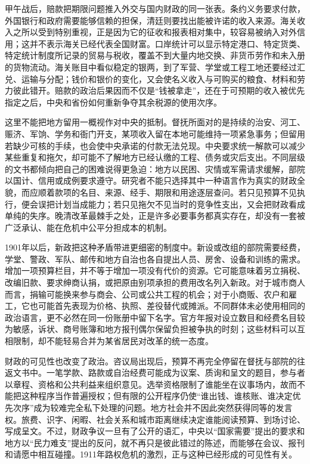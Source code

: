 甲午战后，赔款把期限问题推入外交与国内财政的同一张表。条约义务要求付款，外国银行和政府需要能够信赖的担保，清廷则要找出能被许诺的收入来源。海关收入之所以受到特别重视，正是因为它的征收和报表相对集中，较容易被纳入对外信用；这并不表示海关已经代表全国财富。口岸统计可以显示特定港口、特定货类、特定统计制度所记录的贸易与税收，覆盖不到大量内地交换、非货币劳作和未入册的货物流动。海关账目中看似稳定的银两，到了军营、学堂或工程工地还要经过汇兑、运输与分配；钱价和银价的变化，又会使名义收入与可购买的粮食、材料和劳力彼此错开。赔款的政治后果因而不仅是“钱被拿走”，还在于可预期的收入被优先指定之后，中央和省份如何重新争夺其余税源的使用次序。

这里不能把地方留用一概视作对中央的抵制。督抚所面对的是持续的治安、河工、赈济、军饷、学务和衙门开支，某项收入留在本地可能维持一项紧急事务；但留用若缺少可核的手续，也会使中央承诺的付款无法兑现。中央要求统一解款可以减少某些重复和拖欠，却可能不了解地方已经认缴的工程、债务或灾后支出。不同层级的文书都倾向把自己的困难说得更急迫：地方以民困、灾情或军需请求缓解，部院以国计、信用或成例要求遵守。研究者不能只选择其中一种语言作为真实的财政全貌，而应顺着款项的名目、来源、经手、期限和用途逐层查问。若只见预算不见执行，便会误把计划当成能力；若只见拖欠不见当时的竞争性支出，又会把财政看成单纯的失序。晚清改革最棘手之处，正是许多必要事务都真实存在，却没有一套被广泛承认、能在危机中公平分担成本的机制。

1901年以后，新政把这种矛盾带进更细密的制度中。新设或改组的部院需要经费，学堂、警政、军队、邮传和地方自治也各自提出人员、房舍、设备和训练的需求。增加一项预算栏目，并不等于增加一项没有代价的资源。它可能意味着另立捐税、改编旧款、要求绅商认捐，或把原由别项承担的费用改名列入新政。对于城市商人而言，捐输可能换来参与商会、公司或公共工程的机会；对于小商贩、农户和雇工，它也可能首先表现为价格、执照、差役替代或摊派。不同群体未必使用相同的政治语言，更不必然在同一份账册中留下名字。官方年报对设立数目和经费名目较为敏感，诉状、商号账簿和地方报刊偶尔保留负担被争执的时刻；这些材料可以互相限制，却不能轻易合并为某省居民对改革的统一态度。

财政的可见性也改变了政治。咨议局出现后，预算不再完全停留在督抚与部院的往返文书中。一笔学款、路款或自治经费可能成为议案、质询和呈文的题目，参与者以章程、资格和公共利益来组织意见。选举资格限制了谁能坐在议事场内，故而不能把这种程序当作普遍授权；但有限的公开程序仍使“谁出钱、谁核账、谁决定优先次序”成为较难完全私下处理的问题。地方社会并不因此突然获得同等的发言权。旅费、识字、闲暇、社会关系和城市距离继续决定谁能阅读预算、到场讨论、写成呈文。不过，财政争议一旦有了公开的语汇，中央以“国家需要”提出的要求和地方以“民力难支”提出的反问，就不再只是彼此错过的陈述，而能够在会议、报刊和请愿中相互碰撞。1911年路权危机的激烈，正与这种已经形成的可见性有关。


